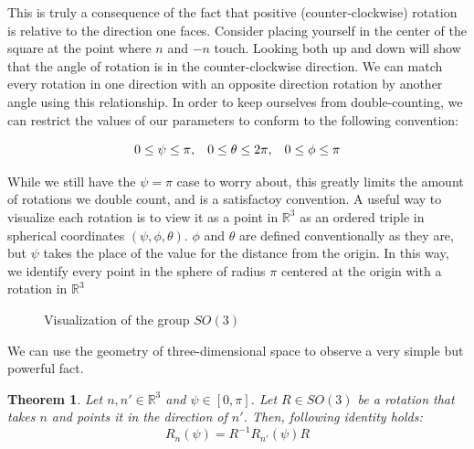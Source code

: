 \documentclass[10pt]{ucthesis}
\newcommand{\R}{\mathbb{R}}
\newtheorem{theorem}[definition]{Theorem}
\begin{document}
This is truly a consequence of the fact that positive (counter-clockwise) rotation is relative to the direction one faces. Consider placing yourself in the center of the square at the point where $n$ and $-n$ touch. Looking both up and down will show that the angle of rotation is in the counter-clockwise direction. We can match every rotation in one direction with an opposite direction rotation by another angle using this relationship. In order to keep ourselves from double-counting, we can restrict the values of our parameters to conform to the following convention: 

$$0\leq\psi\leq\pi, \hspace{3mm} 0\leq\theta\leq2\pi, \hspace{3mm} 0\leq\phi\leq\pi$$

While we still have the $\psi=\pi$ case to worry about, this greatly limits the amount of rotations we double count, and is a satisfactoy convention. A useful way to visualize each rotation is to view it as a point in $\R^3$ as an ordered triple in spherical coordinates $(\psi,\phi,\theta)$. $\phi$ and $\theta$ are defined conventionally as they are, but $\psi$ takes the place of the value for the distance from the origin. In this way, we identify every point in the sphere of radius $\pi$ centered at the origin with a rotation in $\R^3$ \\

\begin{figure}[H]
	\centering
	\caption{Visualization of the group $SO(3)$}
	

\end{figure}

We can use the geometry of three-dimensional space to observe a very simple but powerful fact.

\begin{theorem}
	Let $n, n'\in\R^3$ and $\psi\in[0,\pi]$. Let $R\in SO(3)$ be a rotation that takes $n$ and points it in the direction of $n'$. Then, following identity holds:
$$R_{n}(\psi) = R^{-1}R_{n'}(\psi)R$$
\end{theorem}
\end{document}
